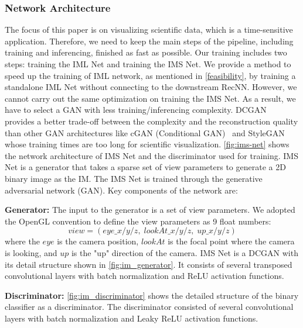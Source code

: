 \subsubsection{Network Architecture}
The focus of this paper is on visualizing scientific data, which is a time-sensitive application. Therefore, we need to keep the main steps of the pipeline, including training and inferencing, finished as fast as possible. Our training includes two steps: training the IML Net and training the IMS Net. We provide a method to speed up the training of IML network, as mentioned in \cref{feasibility}, by training a standalone IML Net without connecting to the downstream RecNN. However, we cannot carry out the same optimization on training the IMS Net. As a result, we have to select a GAN with less training/inferencing complexity. DCGAN~\cite{radford2015unsupervised} provides a better trade-off between the complexity and the reconstruction quality than other GAN architectures like cGAN (Conditional GAN)~\cite{Isola_2017_CVPR} and StyleGAN~\cite{8977347} whose training times are too long for scientific visualization. \cref{fig:ims-net} shows the network architecture of IMS Net and the discriminator used for training. IMS Net is a generator that takes a sparse set of view parameters to generate a 2D binary image as the IM. The IMS Net is trained through the generative adversarial network (GAN). Key components of the network are:

\textbf{Generator:}
The input to the generator is a set of view parameters. We adopted the OpenGL convention to define the view parameters as 9 float numbers:
\begin{equation}
view = (eye\_x/y/z, \; lookAt\_x/y/z, \; up\_x/y/z)
\end{equation}
where the $eye$ is the camera position, $lookAt$ is the focal point where the camera is looking, and $up$ is the "up" direction of the camera. IMS Net is a DCGAN with its detail structure shown in \cref{fig:im_generator}. It consists of several transposed convolutional layers with batch normalization and ReLU activation functions.

\textbf{Discriminator:}
\cref{fig:im_discriminator} shows the detailed structure of the binary classifier as a discriminator. The discriminator consisted of several convolutional layers with batch normalization and Leaky ReLU activation functions.


